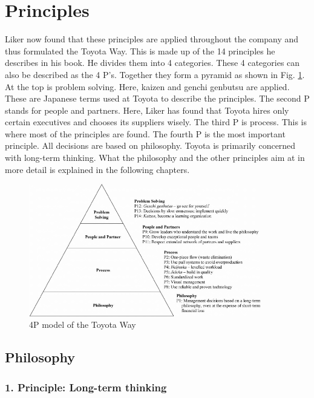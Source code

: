 \documentclass[a4paper,12pt]{scrartcl}
\begin{document}
\clearpage

\section{Principles}

Liker now found that these principles are applied throughout the company and thus formulated the Toyota Way. This is made up of the 14 principles he describes in his book. He divides them into 4 categories. These 4 categories can also be described as the 4 P's. Together they form a pyramid as shown in Fig. \ref{4P}. At the top is problem solving. Here, kaizen and genchi genbutsu are applied. These are Japanese terms used at Toyota to describe the principles. The second P stands for people and partners. Here, Liker has found that Toyota hires only certain executives and chooses its suppliers wisely. The third P is process. This is where most of the principles are found. The fourth P is the most important principle. All decisions are based on philosophy. Toyota is primarily concerned with long-term thinking. What the philosophy and the other principles aim at in more detail is explained in the following chapters.

\begin{figure}[h] 
  \centering
     \includegraphics[width=0.9\textwidth]{4P.png}
  \caption{4P model of the Toyota Way}
  \label{4P}
\end{figure}

\subsection{Philosophy}



\subsubsection{1. Principle: Long-term thinking}
\end{document}
